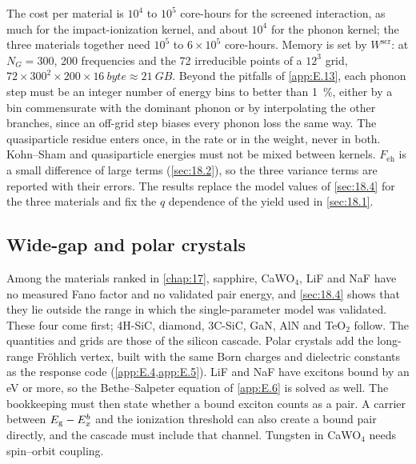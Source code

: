 The cost per material is $10^4$ to $10^5$ core-hours for the screened interaction, as much for the impact-ionization kernel, and about $10^4$ for the phonon kernel; the three materials together need $10^5$ to $6\times10^5$ core-hours. Memory is set by $W^{\mathrm{scr}}$: at $N_G = 300$, 200 frequencies and the 72 irreducible points of a $12^3$ grid, $72\times300^2\times200\times\SI{16}{byte} \approx \SI{21}{GB}$. Beyond the pitfalls of \cref{app:E.13}, each phonon step must be an integer number of energy bins to better than \SI{1}{\percent}, either by a bin commensurate with the dominant phonon or by interpolating the other branches, since an off-grid step biases every phonon loss the same way. The quasiparticle residue enters once, in the rate or in the weight, never in both. Kohn--Sham and quasiparticle energies must not be mixed between kernels. $F_{\mathrm{eh}}$ is a small difference of large terms (\cref{sec:18.2}), so the three variance terms are reported with their errors. The results replace the model values of \cref{sec:18.4} for the three materials and fix the $q$ dependence of the yield used in \cref{sec:18.1}.

\subsection{Wide-gap and polar crystals}

Among the materials ranked in \cref{chap:17}, sapphire, CaWO$_4$, LiF and NaF have no measured Fano factor and no validated pair energy, and \cref{sec:18.4} shows that they lie outside the range in which the single-parameter model was validated. These four come first; 4H-SiC, diamond, 3C-SiC, GaN, AlN and TeO$_2$ follow. The quantities and grids are those of the silicon cascade. Polar crystals add the long-range Fr\"ohlich vertex, built with the same Born charges and dielectric constants as the response code (\cref{app:E.4,app:E.5}). LiF and NaF have excitons bound by an eV or more, so the Bethe--Salpeter equation of \cref{app:E.6} is solved as well. The bookkeeping must then state whether a bound exciton counts as a pair. A carrier between $E_{\mathrm{g}} - E_x^b$ and the ionization threshold can also create a bound pair directly, and the cascade must include that channel. Tungsten in CaWO$_4$ needs spin--orbit coupling.

